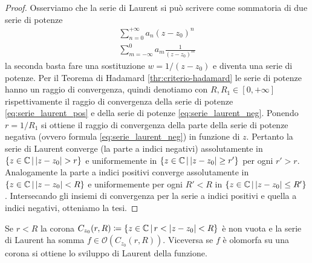 \begin{proof}
  Osserviamo che la serie di Laurent si può scrivere come sommatoria di due serie di
  potenze
  \begin{align}
    \label{eq:serie_laurent_pos}
    \sum_{n=0}^{+\infty} a_n (z-z_0)^{n} \\
    \label{eq:serie_laurent_neg}
    \sum_{m=-\infty}^{0} a_{m} \frac{1}{(z-z_0)^{m}}
  \end{align}
  la seconda basta fare una sostituzione $w = 1/(z-z_0)$ e diventa una serie di
  potenze.
  Per il Teorema di Hadamard \ref{thr:criterio-hadamard} le serie di potenze
  hanno un raggio di convergenza, quindi denotiamo con $R, R_1 \in \left[ 0, 
  +\infty \right]$ rispettivamente il raggio di convergenza della serie di
  potenze \ref{eq:serie_laurent_pos} e della serie di potenze
  \ref{eq:serie_laurent_neg}. Ponendo $r = 1/R_1$ si ottiene il raggio di
  convergenza della parte della serie di potenze negativa (ovvero formula
  \ref{eq:serie_laurent_neg}) in funzione di $z$. Pertanto la serie di Laurent
  converge (la parte a indici negativi) assolutamente in 
  $\left\{z \in \mathbb{C} \,\middle|\, |z-z_0| > r \right\}$
  e uniformemente in $\left\{ z \in \mathbb{C} \,\middle|\, |z-z_0| \ge r' \right\}$ per
  ogni $r' > r$. Analogamente la parte a indici positivi converge assolutamente
  in $\left\{ z \in \mathbb{C} \,\middle|\, |z -z_0| < R  \right\}$ e uniformemente per
  ogni $R' < R$ in $\left\{ z \in \mathbb{C} \,\middle|\, |z -z_0| \le R'  \right\}$.
  Intersecando gli insiemi di convergenza per la serie a indici positivi
  e quella a indici negativi, otteniamo la tesi.
\end{proof}

\begin{remark}
  Se $r < R$ la corona $C_{z_0}(r,R) \coloneqq \left\{ z \in \mathbb{C} \,\middle|\,
  r < |z - z_0|  < R \right\}$ è non vuota e la serie di Laurent ha somma $f \in
  \mathcal{O}(C_{z_0}(r,R))$. Viceversa se $f$ è olomorfa su una corona si
  ottiene lo sviluppo di Laurent della funzione.
  \label{rmk:reverso_card_holo_func}
\end{remark}

